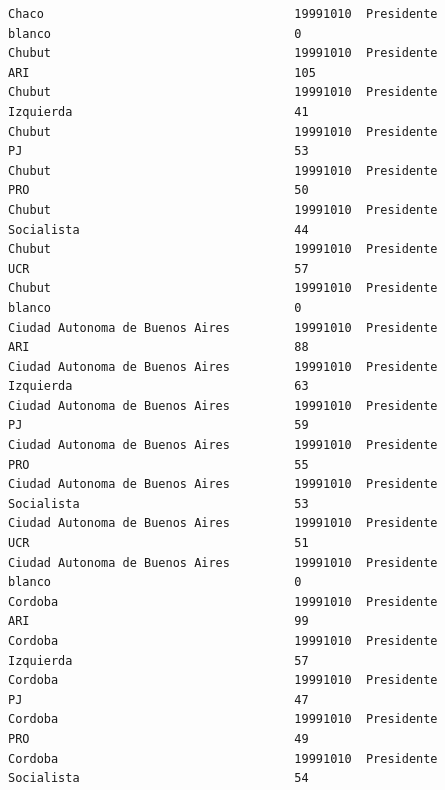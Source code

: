 \documentclass[a4paper,10pt]{article}
\begin{document}
\begin{verbatim}
Chaco                                   19991010  Presidente                    blanco                                  0              
Chubut                                  19991010  Presidente                    ARI                                     105            
Chubut                                  19991010  Presidente                    Izquierda                               41             
Chubut                                  19991010  Presidente                    PJ                                      53             
Chubut                                  19991010  Presidente                    PRO                                     50             
Chubut                                  19991010  Presidente                    Socialista                              44             
Chubut                                  19991010  Presidente                    UCR                                     57             
Chubut                                  19991010  Presidente                    blanco                                  0              
Ciudad Autonoma de Buenos Aires         19991010  Presidente                    ARI                                     88             
Ciudad Autonoma de Buenos Aires         19991010  Presidente                    Izquierda                               63             
Ciudad Autonoma de Buenos Aires         19991010  Presidente                    PJ                                      59             
Ciudad Autonoma de Buenos Aires         19991010  Presidente                    PRO                                     55             
Ciudad Autonoma de Buenos Aires         19991010  Presidente                    Socialista                              53             
Ciudad Autonoma de Buenos Aires         19991010  Presidente                    UCR                                     51             
Ciudad Autonoma de Buenos Aires         19991010  Presidente                    blanco                                  0              
Cordoba                                 19991010  Presidente                    ARI                                     99             
Cordoba                                 19991010  Presidente                    Izquierda                               57             
Cordoba                                 19991010  Presidente                    PJ                                      47             
Cordoba                                 19991010  Presidente                    PRO                                     49             
Cordoba                                 19991010  Presidente                    Socialista                              54             

\end{verbatim}
\end{document}

